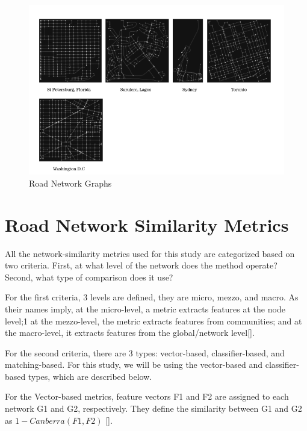 \begin{figure}[h!]
\centering
\includegraphics[width=1.0\textwidth,center]{picture/Graphs2.png}
\caption[Road Network Graphs]{Road Network Graphs}
\label{fig:roadnetworkgraphs}
\end{figure}

\section{Road Network Similarity Metrics}
All the network-similarity metrics used for this study are categorized based on two criteria. First, at what level of the network does the method operate? Second, what type of comparison does it use? 

For the first criteria, 3 levels are defined, they are micro, mezzo, and macro. As their names imply, at the micro-level, a metric extracts features at the node level;1 at the mezzo-level, the metric extracts features from communities; and at the macro-level, it extracts features from the global/network level[\cite{Soundarajan:2014}].


For the second criteria, there are 3 types: vector-based, classifier-based, and matching-based. For this study, we will be using the vector-based and classifier-based types, which are described below. 

For the Vector-based metrics, feature vectors F1 and F2 are assigned to each network G1 and G2, respectively. They define the similarity between G1 and G2 as $1-Canberra(F1, F2)$ [\cite{Richards:2010}].

